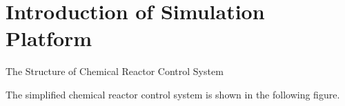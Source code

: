 
\section{Introduction of Simulation Platform}

\begin{frame}{The Structure of Chemical Reactor Control System}
  \begin{overlayarea}{\textwidth}{7cm}
  The simplified chemical reactor control system is shown in the following figure.
  \begin{center}
    \resizebox{0.8\textwidth}{!}{
      \ifCompleteCompile
        
      \fi
    }
  \end{center}  
  \end{overlayarea} 
\end{frame}

